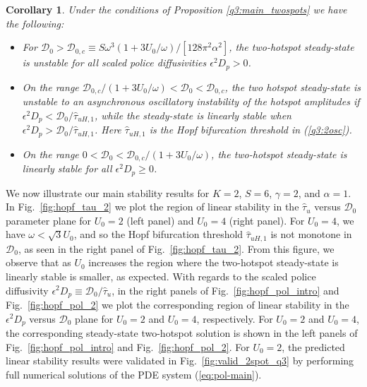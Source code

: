 \documentclass{article}%
\newtheorem{cor}[theorem]{Corollary}
\begin{document}
\begin{cor}\label{q3:main_twospots_pol} Under the conditions of
Proposition \ref{q3:main_twospots} we have the following:
\begin{itemize}
  \item For ${\mathcal D}_0>{\mathcal D}_{0,c} \equiv {S\omega^3
    \left(1+{3U_0/\omega}\right)/[128\pi^2\alpha^2]}$, the two-hotspot
    steady-state is unstable for all scaled police diffusivities $\epsilon^2
    D_p>0$.
 \item On the range ${{\mathcal D}_{0,c}/\left(1+{3U_0/\omega}\right)}
   < {\mathcal D}_0 <{\mathcal D}_{0,c}$, the two hotspot
   steady-state is unstable to an asynchronous oscillatory instability
   of the hotspot amplitudes if $\epsilon^2 D_p<{{\mathcal
       D}_{0}/\hat{\tau}_{uH,1}}$, while the steady-state is linearly
   stable when $\epsilon^2 D_p>{{\mathcal
       D}_{0}/\hat{\tau}_{uH,1}}$. Here $\hat{\tau}_{uH,1}$ is the
   Hopf bifurcation threshold in (\ref{q3:2osc}).
\item On the range $0<{\mathcal D}_0 < {{\mathcal
    D}_{0,c}/\left(1+{3U_0/\omega}\right)}$, the two-hotspot
  steady-state is linearly stable for all $\epsilon^2 D_p\geq 0$.
\end{itemize}
\end{cor}

We now illustrate our main stability results for $K=2$, $S=6$,
$\gamma=2$, and $\alpha=1$. In Fig.~\ref{fig:hopf_tau_2} we plot the
region of linear stability in the $\hat{\tau}_u$ versus ${\mathcal
  D}_0$ parameter plane for $U_0=2$ (left panel) and $U_0=4$ (right
panel). For $U_0=4$, we have $\omega<\sqrt{3}U_0$, and so the Hopf
bifurcation threshold $\hat{\tau}_{uH,1}$ is not monotone in
${\mathcal D}_0$, as seen in the right panel of
Fig.~\ref{fig:hopf_tau_2}. From this figure, we observe that as $U_0$
increases the region where the two-hotspot steady-state is linearly
stable is smaller, as expected. With regards to the scaled police
diffusivity $\epsilon^2 D_p\equiv {{\mathcal D}_0/\hat{\tau}_u}$, in
the right panels of Fig.~\ref{fig:hopf_pol_intro} and
Fig.~\ref{fig:hopf_pol_2} we plot the corresponding region of linear
stability in the $\epsilon^2 D_p$ versus ${\mathcal D}_{0}$ plane for
$U_0=2$ and $U_0=4$, respectively. For $U_0=2$ and $U_0=4$, the
corresponding steady-state two-hotspot solution is shown in the left
panels of Fig.~\ref{fig:hopf_pol_intro} and Fig.~\ref{fig:hopf_pol_2}.
For $U_0=2$, the predicted linear stability results were validated in
Fig.~\ref{fig:valid_2spot_q3} by performing full numerical
solutions of the PDE system (\ref{eq:pol-main}). 
\end{document}
